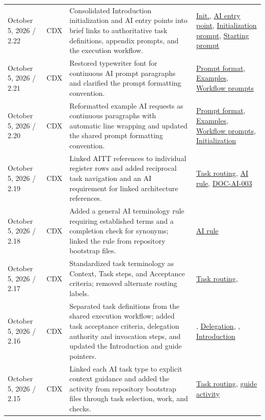 \begin{tabularx}{\linewidth}{L{3.1cm}L{2.2cm}YL{2.5cm}}
October 5, 2026 / 2.22 & CDX & Consolidated Introduction initialization and AI entry points into brief links to authoritative task definitions, appendix prompts, and the execution workflow. & \hyperref[Section:InitializeNewProject]{Init.}, \hyperref[Section:UsingTemplateAI]{AI entry point}, \hyperref[Section:AIInitializePrompt]{Initialization prompt}, \hyperref[Section:AIStartSelectedTaskPrompt]{Starting prompt}\\
October 5, 2026 / 2.21 & CDX & Restored typewriter font for continuous AI prompt paragraphs and clarified the prompt formatting convention. & \hyperref[Section:AIPromptFormatting]{Prompt format}, \hyperref[Section:AIExamplePrompts]{Examples}, \hyperref[Section:AIImplementationStart]{Workflow prompts}\\
October 5, 2026 / 2.20 & CDX & Reformatted example AI requests as continuous paragraphs with automatic line wrapping and updated the shared prompt formatting convention. & \hyperref[Section:AIPromptFormatting]{Prompt format}, \hyperref[Section:AIExamplePrompts]{Examples}, \hyperref[Section:AIImplementationStart]{Workflow prompts}, \hyperref[Section:InitializeNewProject]{Initialization}\\
October 5, 2026 / 2.19 & CDX & Linked AITT references to individual register rows and added reciprocal task navigation and an AI requirement for linked architecture references. & \hyperref[Table:AISkills]{Task routing}, \hyperref[Rule:AIReferenceLinks]{AI rule}, \hyperref[Requirement:DOCAI003]{DOC-AI-003}\\
October 5, 2026 / 2.18 & CDX & Added a general AI terminology rule requiring established terms and a completion check for synonyms; linked the rule from repository bootstrap files. & \hyperref[Rule:AITerminologyConsistency]{AI rule}\\
October 5, 2026 / 2.17 & CDX & Standardized task terminology as Context, Task steps, and Acceptance criteria; removed alternate routing labels. & \hyperref[Table:AISkills]{Task routing}, \\
October 5, 2026 / 2.16 & CDX & Separated task definitions from the shared execution workflow; added task acceptance criteria, delegation authority and invocation steps, and updated the Introduction and guide pointers. & , \hyperref[Section:AIAgentDelegation]{Delegation}, , \hyperref[Section:InitializeNewProject]{Introduction}\\
October 5, 2026 / 2.15 & CDX & Linked each AI task type to explicit context guidance and added the activity from repository bootstrap files through task selection, work, and checks. & \hyperref[Table:AISkills]{Task routing}, \hyperref[Figure:AIGuideActivity]{guide activity}\\

\end{tabularx}
